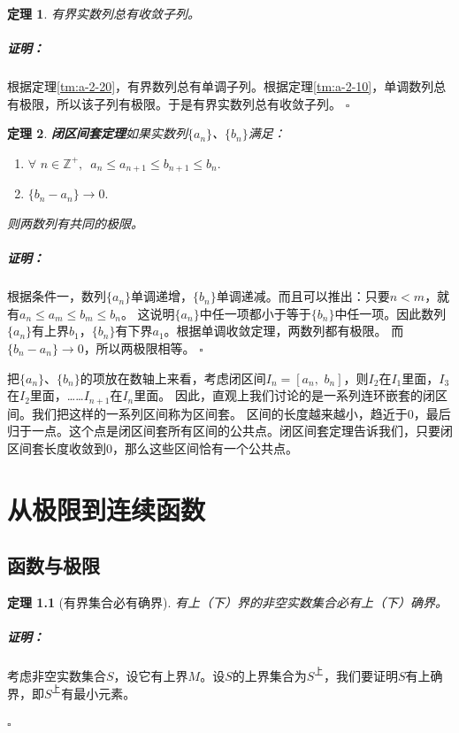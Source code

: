 \documentclass[12pt,UTF8]{ctexbook}
\newtheorem{tm}{定理}[section]
\renewenvironment{proof}{\paragraph{\textbf{证明：}}}{\hfill$\square$}
\begin{document}
\begin{appendix}
\begin{tm}\label{tm:a-2-30}
    有界实数列总有收敛子列。
\end{tm}
\begin{proof}
    根据定理\ref{tm:a-2-20}，有界数列总有单调子列。根据定理\ref{tm:a-2-10}，单调数列总有极限，所以该子列有极限。于是有界实数列总有收敛子列。
\end{proof}

\begin{tm}\textbf{闭区间套定理}\label{tm:a-2-40}
    如果实数列$\{a_n\}$、$\{b_n\}$满足：
    \begin{enumerate}
        \item $\forall\,\, n\in\mathbb{Z}^+, \,\,\, a_n \leqslant a_{n+1} \leqslant b_{n+1} \leqslant b_n.$
        \item $\{b_n - a_n\} \to 0.$
    \end{enumerate}
    则两数列有共同的极限。
\end{tm}
\begin{proof}
    根据条件一，数列$\{a_n\}$单调递增，$\{b_n\}$单调递减。而且可以推出：只要$n<m$，就有$a_n \leqslant a_{m} \leqslant b_{m} \leqslant b_n$。
    这说明$\{a_n\}$中任一项都小于等于$\{b_n\}$中任一项。因此数列$\{a_n\}$有上界$b_1$，$\{b_n\}$有下界$a_1$。根据单调收敛定理，两数列都有极限。
    而$\{b_n - a_n\} \to 0$，所以两极限相等。
\end{proof}

把$\{a_n\}$、$\{b_n\}$的项放在数轴上来看，考虑闭区间$I_n = [a_{n},\,\, b_{n}]$，则$I_{2}$在$I_1$里面，$I_{3}$在$I_2$里面，……$I_{n+1}$在$I_n$里面。
因此，直观上我们讨论的是一系列连环嵌套的闭区间。我们把这样的一系列区间称为区间套。
区间的长度越来越小，趋近于$0$，最后归于一点。这个点是闭区间套所有区间的公共点。闭区间套定理告诉我们，只要闭区间套长度收敛到$0$，那么这些区间恰有一个公共点。

\chapter{从极限到连续函数}
\section{函数与极限}
\begin{tm}[有界集合必有确界]\label{tm:b-0-0}
    有上（下）界的非空实数集合必有上（下）确界。
\end{tm}
\begin{proof}
    考虑非空实数集合$S$，设它有上界$M$。设$S$的上界集合为$S^{\text{上}}$，我们要证明$S$有上确界，即$S^{\text{上}}$有最小元素。


\end{proof}
\end{appendix}
\end{document}
